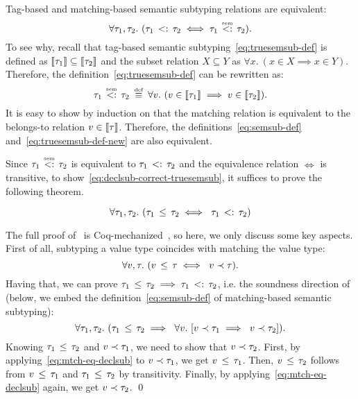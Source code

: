 Tag-based and matching-based semantic subtyping relations 
are equivalent:
\[
\forall \ty_1, \ty_2.\ 
(\bjsemsub{\ty_1}{\ty_2} \iff \bjtruesemsub{\ty_1}{\ty_2}).
\]
To see why, recall that tag-based semantic subtyping~\eqref{eq:truesemsub-def} 
is defined as $\llbracket \tau_1 \rrbracket \subseteq \llbracket \tau_2 \rrbracket$
and the subset relation $X \subseteq Y$ as
$\forall x.\ (x \in X \implies x \in Y)$.
Therefore, the definition~\eqref{eq:truesemsub-def} can be 
rewritten as:
\begin{equation}\label{eq:truesemsub-def-new}
\bjtruesemsub{\ty_1}{\ty_2} \;\defsign \;
\forall \vty.\ (\vty \in \interpty{\ty_1} \implies \vty \in \interpty{\ty_2}).
\end{equation}
It is easy to show by induction on \ty that the matching relation
is equivalent to the belongs-to relation $v \in \llbracket \tau \rrbracket$. 
Therefore, the definitions~\eqref{eq:semsub-def}
and~\eqref{eq:truesemsub-def-new} are also equivalent.

Since $\bjtruesemsub{\ty_1}{\ty_2}$ is equivalent to $\tau_1 \, <: \, \tau_2$
and the equivalence relation $\iff$ is transitive,
to show~\eqref{eq:declsub-correct-truesemsub},
it suffices to prove the following theorem.

\begin{theorem}\label{thm:declsub-correct}
	\[
	\forall \tau_1, \tau_2.\ (\tau_1 \, \leq \, \tau_2 \iff\ \tau_1 \, <: \, \tau_2)
	\]
\end{theorem}

The full proof of~ is 
Coq-mechanized~\cite{bib:MiniJlCoq},
so here, we only discuss some key aspects.
First of all, subtyping a value type coincides with matching the value type:
\begin{equation}\label{eq:mtch-eq-declsub}
\forall v, \tau.\ (v \, \leq \, \tau \iff\ v \prec \tau).
\end{equation}
Having that, we can prove 
$\tau_1 \, \leq \, \tau_2 \implies \tau_1 \, <: \, \tau_2$,
i.e. the soundness direction of~
(below, we embed the definition~\eqref{eq:semsub-def} of 
matching-based semantic subtyping):
\begin{equation}\label{eq:declsub-imp-semsub}
\forall \ty_1, \ty_2.\ 
(\bjsub{\ty_1}{\ty_2} \implies\ 
\forall \vty.\ [\bjmtch{\vty}{\ty_1} \implies\ \bjmtch{\vty}{\ty_2}]).
\end{equation}
Knowing $\tau_1 \, \leq \, \tau_2$ and $v \prec \tau_1$,
we need to show that $v \prec \tau_2$.
First, by applying~\eqref{eq:mtch-eq-declsub} to $v \prec \tau_1$,
we get $v \, \leq \, \tau_1$.
Then, $v \, \leq \, \tau_2$ follows from $v \, \leq \, \tau_1$ 
and $\tau_1 \, \leq \, \tau_2$ by transitivity.
Finally, by applying~\eqref{eq:mtch-eq-declsub} again,
we get $v \prec \tau_2$. \qed


